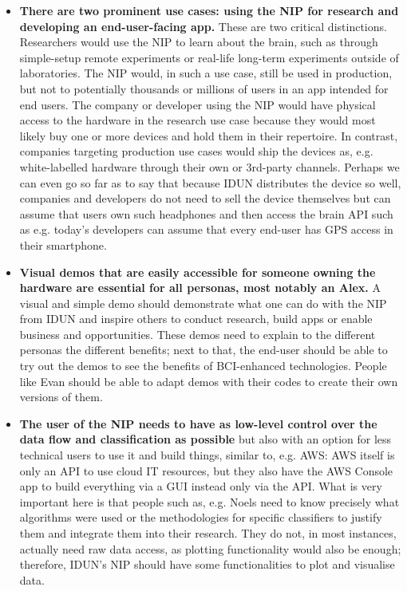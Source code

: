 \begin{itemize}
  \item \textbf{There are two prominent use cases: using the NIP for research and developing an end-user-facing app.} These are two critical distinctions. Researchers would use the NIP to learn about the brain, such as through simple-setup remote experiments or real-life long-term experiments outside of laboratories. The NIP would, in such a use case, still be used in production, but not to potentially thousands or millions of users in an app intended for end users. The company or developer using the NIP would have physical access to the hardware in the research use case because they would most likely buy one or more devices and hold them in their repertoire. In contrast, companies targeting production use cases would ship the devices as, e.g. white-labelled hardware through their own or 3rd-party channels. Perhaps we can even go so far as to say that because IDUN distributes the device so well, companies and developers do not need to sell the device themselves but can assume that users own such headphones and then access the brain API such as e.g. today's developers can assume that every end-user has GPS access in their smartphone.
  \item \textbf{Visual demos that are easily accessible for someone owning the hardware are essential for all personas, most notably an Alex.} A visual and simple demo should demonstrate what one can do with the NIP from IDUN and inspire others to conduct research, build apps or enable business and opportunities. These demos need to explain to the different personas the different benefits; next to that, the end-user should be able to try out the demos to see the benefits of BCI-enhanced technologies. People like Evan should be able to adapt demos with their codes to create their own versions of them.
  \item \textbf{The user of the NIP needs to have as low-level control over the data flow and classification as possible} but also with an option for less technical users to use it and build things, similar to, e.g. AWS: AWS itself is only an API to use cloud IT resources, but they also have the AWS Console app to build everything via a GUI instead only via the API. What is very important here is that people such as, e.g. Noels need to know precisely what algorithms were used or the methodologies for specific classifiers to justify them and integrate them into their research. They do not, in most instances, actually need raw data access, as plotting functionality would also be enough; therefore, IDUN's NIP should have some functionalities to plot and visualise data.

\end{itemize}
